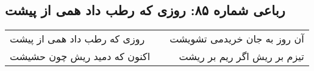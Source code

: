 \begin{center}
\section*{رباعی شماره ۸۵: روزی که رطب داد همی از پیشت}
\label{sec:sh085}
\begin{longtable}{l p{0.5cm} r}
روزی که رطب داد همی از پیشت
&&
آن روز به جان خریدمی تشویشت
\\
اکنون که دمید ریش چون حشیشت
&&
تیزم بر ریش اگر ریم بر ریشت
\\
\end{longtable}
\end{center}
